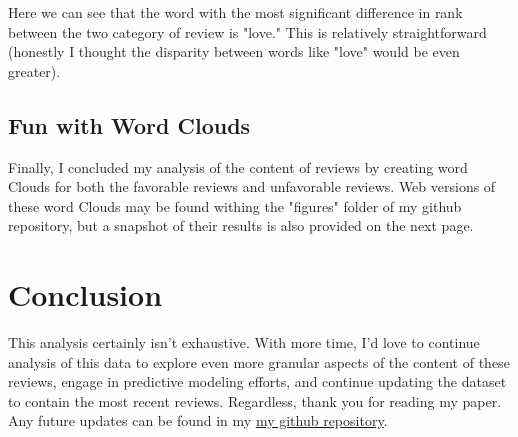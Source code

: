 \documentclass[a4paper,12pt]{article}
\begin{document}
Here we can see that the word with the most significant difference in rank between the two category of review is "love." This is relatively straightforward (honestly I thought the disparity between words like "love" would be even greater). 

\subsection{Fun with Word Clouds}
Finally, I concluded my analysis of the content of reviews by creating word Clouds for both the favorable reviews and unfavorable reviews. Web versions of these word Clouds may be found withing the "figures" folder of my github repository, but a snapshot of their results is also provided on the next page. 

\section{Conclusion}
This analysis certainly isn't exhaustive. With more time, I'd love to continue analysis of this data to explore even more granular aspects of the content of these reviews, engage in predictive modeling efforts, and continue updating the dataset to contain the most recent reviews. Regardless, thank you for reading my paper. Any future updates can be found in my \href{https://github.com/mannyrockwell/bios-611-project}{my github repository}. 
\end{document}
